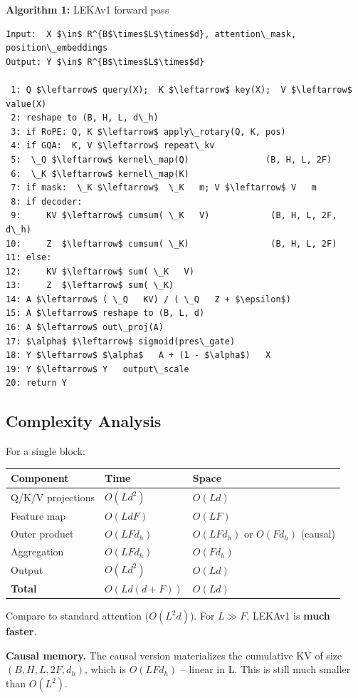 \textbf{Algorithm 1:} LEKAv1 forward pass
\begin{lstlisting}
Input:  X $\in$ R^{B$\times$L$\times$d}, attention\_mask, position\_embeddings
Output: Y $\in$ R^{B$\times$L$\times$d}

 1: Q $\leftarrow$ query(X);  K $\leftarrow$ key(X);  V $\leftarrow$ value(X)
 2: reshape to (B, H, L, d\_h)
 3: if RoPE: Q, K $\leftarrow$ apply\_rotary(Q, K, pos)
 4: if GQA:  K, V $\leftarrow$ repeat\_kv
 5:  \_Q $\leftarrow$ kernel\_map(Q)               (B, H, L, 2F)
 6:  \_K $\leftarrow$ kernel\_map(K)
 7: if mask:  \_K $\leftarrow$  \_K   m; V $\leftarrow$ V   m
 8: if decoder:
 9:     KV $\leftarrow$ cumsum( \_K   V)            (B, H, L, 2F, d\_h)
10:     Z  $\leftarrow$ cumsum( \_K)                (B, H, L, 2F)
11: else:
12:     KV $\leftarrow$ sum( \_K   V)
13:     Z  $\leftarrow$ sum( \_K)
14: A $\leftarrow$ ( \_Q   KV) / ( \_Q   Z + $\epsilon$)
15: A $\leftarrow$ reshape to (B, L, d)
16: A $\leftarrow$ out\_proj(A)
17: $\alpha$ $\leftarrow$ sigmoid(pres\_gate)
18: Y $\leftarrow$ $\alpha$   A + (1 - $\alpha$)   X
19: Y $\leftarrow$ Y   output\_scale
20: return Y
\end{lstlisting}

\subsection{Complexity Analysis}

For a single block:

\begin{table}[H]
\centering
\small
\begin{tabular}{lll}
\toprule
\textbf{Component} & \textbf{Time} & \textbf{Space} \\
\midrule
Q/K/V projections & $O(L d^2)$ & $O(L d)$ \\
Feature map & $O(L d F)$ & $O(L F)$ \\
Outer product & $O(L F d_h)$ & $O(L F d_h)$ or $O(F d_h)$ (causal) \\
Aggregation & $O(L F d_h)$ & $O(F d_h)$ \\
Output & $O(L d^2)$ & $O(L d)$ \\
\textbf{Total} & $O(L d (d + F))$ & $O(L d)$ \\
\bottomrule
\end{tabular}
\end{table}

Compare to standard attention ($O(L^2 d)$). For $L \gg F$, LEKAv1 is 
\textbf{much faster}.

\textbf{Causal memory.} The causal version materializes the cumulative KV 
of size $(B, H, L, 2F, d_h)$, which is $O(L F d_h)$ -- linear in L. 
This is still much smaller than $O(L^2)$.

